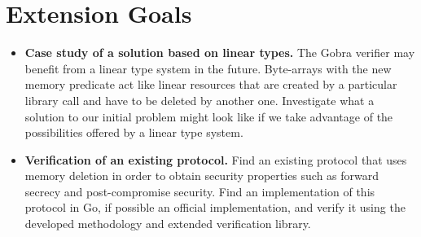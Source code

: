 \documentclass{article}
\begin{document}
\section{Extension Goals}

\begin{itemize}
      \item \textbf{Case study of a solution based on linear types.} The Gobra verifier may benefit from a linear type system in the future. Byte-arrays with the new memory predicate act like linear resources that are created by a particular library call and have to be deleted by another one. Investigate what a solution to our initial problem might look like if we take advantage of the possibilities offered by a linear type system.
      \item \textbf{Verification of an existing protocol.} Find an existing protocol that uses memory deletion in order to obtain security properties such as forward secrecy and post-compromise security. Find an implementation of this protocol in Go, if possible an official implementation, and verify it using the developed methodology and extended verification library.
\end{itemize}




\end{document}
